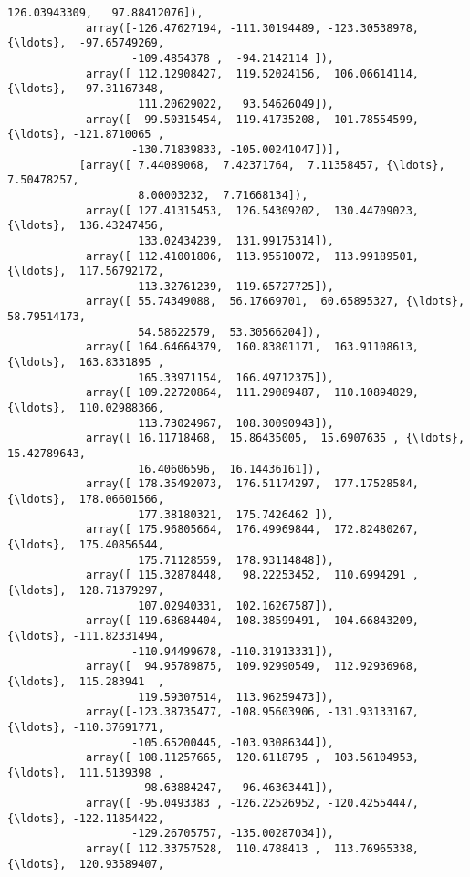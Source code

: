 \documentclass[11pt]{article}
\begin{document}
\begin{Verbatim}[commandchars=\\\{\}]
                    126.03943309,   97.88412076]),
            array([-126.47627194, -111.30194489, -123.30538978, {\ldots},  -97.65749269,
                   -109.4854378 ,  -94.2142114 ]),
            array([ 112.12908427,  119.52024156,  106.06614114, {\ldots},   97.31167348,
                    111.20629022,   93.54626049]),
            array([ -99.50315454, -119.41735208, -101.78554599, {\ldots}, -121.8710065 ,
                   -130.71839833, -105.00241047])],
           [array([ 7.44089068,  7.42371764,  7.11358457, {\ldots},  7.50478257,
                    8.00003232,  7.71668134]),
            array([ 127.41315453,  126.54309202,  130.44709023, {\ldots},  136.43247456,
                    133.02434239,  131.99175314]),
            array([ 112.41001806,  113.95510072,  113.99189501, {\ldots},  117.56792172,
                    113.32761239,  119.65727725]),
            array([ 55.74349088,  56.17669701,  60.65895327, {\ldots},  58.79514173,
                    54.58622579,  53.30566204]),
            array([ 164.64664379,  160.83801171,  163.91108613, {\ldots},  163.8331895 ,
                    165.33971154,  166.49712375]),
            array([ 109.22720864,  111.29089487,  110.10894829, {\ldots},  110.02988366,
                    113.73024967,  108.30090943]),
            array([ 16.11718468,  15.86435005,  15.6907635 , {\ldots},  15.42789643,
                    16.40606596,  16.14436161]),
            array([ 178.35492073,  176.51174297,  177.17528584, {\ldots},  178.06601566,
                    177.38180321,  175.7426462 ]),
            array([ 175.96805664,  176.49969844,  172.82480267, {\ldots},  175.40856544,
                    175.71128559,  178.93114848]),
            array([ 115.32878448,   98.22253452,  110.6994291 , {\ldots},  128.71379297,
                    107.02940331,  102.16267587]),
            array([-119.68684404, -108.38599491, -104.66843209, {\ldots}, -111.82331494,
                   -110.94499678, -110.31913331]),
            array([  94.95789875,  109.92990549,  112.92936968, {\ldots},  115.283941  ,
                    119.59307514,  113.96259473]),
            array([-123.38735477, -108.95603906, -131.93133167, {\ldots}, -110.37691771,
                   -105.65200445, -103.93086344]),
            array([ 108.11257665,  120.6118795 ,  103.56104953, {\ldots},  111.5139398 ,
                     98.63884247,   96.46363441]),
            array([ -95.0493383 , -126.22526952, -120.42554447, {\ldots}, -122.11854422,
                   -129.26705757, -135.00287034]),
            array([ 112.33757528,  110.4788413 ,  113.76965338, {\ldots},  120.93589407,

\end{Verbatim}
\end{document}
